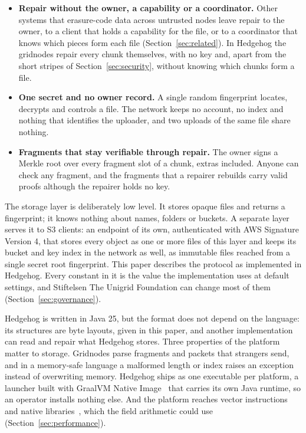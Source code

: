 \documentclass[10pt,a4paper,final]{article}
\begin{document}
\begin{itemize}
	\item \textbf{Repair without the owner, a capability or a coordinator.} Other systems that erasure-code data
	      across untrusted nodes leave repair to the owner, to a client that holds a capability for the file, or to
	      a coordinator that knows which pieces form each file (Section~\ref{sec:related}). In Hedgehog the gridnodes
	      repair every chunk themselves, with no key and, apart from the short stripes of Section~\ref{sec:security},
	      without knowing which chunks form a file.
	\item \textbf{One secret and no owner record.} A single random fingerprint locates, decrypts and controls a
	      file. The network keeps no account, no index and nothing that identifies the uploader, and two uploads of
	      the same file share nothing.
	\item \textbf{Fragments that stay verifiable through repair.} The owner signs a Merkle root over every fragment
	      slot of a chunk, extras included. Anyone can check any fragment, and the fragments that a repairer rebuilds
	      carry valid proofs although the repairer holds no key.
\end{itemize}

The storage layer is deliberately low level. It stores opaque files and returns a fingerprint; it knows nothing
about names, folders or buckets. A separate layer serves it to S3 clients: an endpoint of its own, authenticated
with AWS Signature Version 4, that stores every object as one or more files of this layer and keeps its bucket and
key index in the network as well, as immutable files reached from a single secret root fingerprint. This paper
describes the protocol as implemented in Hedgehog. Every constant in it is the value the implementation uses at
default settings, and Stiftelsen The Unigrid Foundation can change most of them
(Section~\ref{sec:governance}).

Hedgehog is written in Java 25, but the format does not depend on the language: its structures are byte layouts,
given in this paper, and another implementation can read and repair what Hedgehog stores. Three properties of the
platform matter to storage. Gridnodes parse fragments and packets that strangers send, and in a memory-safe language
a malformed length or index raises an exception instead of overwriting memory. Hedgehog ships as one executable per
platform, a launcher built with GraalVM Native Image~\cite{graalvm} that carries its own Java runtime, so an operator
installs nothing else. And the platform reaches vector instructions and native libraries~\cite{jep508,jep454}, which
the field arithmetic could use (Section~\ref{sec:performance}).
\end{document}
